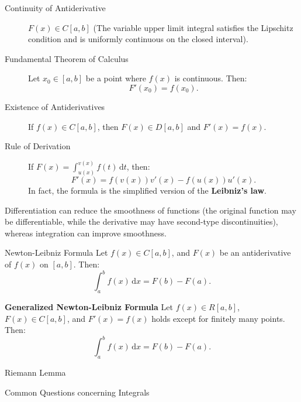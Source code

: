 \documentclass[11pt]{../../TexTemplate/elegantbook}
\begin{document}
\begin{property}
    \begin{description}
        \item [Continuity of Antiderivative]  \( F(x) \in C[a, b] \) (The variable upper limit integral satisfies the 
            Lipschitz condition and is uniformly continuous on the closed interval).
        \item [Fundamental Theorem of Calculus] Let \( x_0 \in [a, b] \) be a point where \( f(x) \) is continuous. Then:
            \[
            F'(x_0) = f(x_0).
            \]
        \item [Existence of Antiderivatives] If \( f(x) \in C[a, b] \), then \( F(x) \in D[a, b] \) and \( F'(x) = f(x) \).
        \item [Rule of Derivation] If \( F(x) = \int_{u(x)}^{v(x)} f(t) \, \mathrm{d}t \), then:
            \[
            F'(x) = f(v(x))v'(x) - f(u(x))u'(x).
            \]
            In fact, the formula is the simplified version of the \textbf{Leibniz's law}.
    \end{description}
\end{property}


\begin{remark}
        Differentiation can reduce the smoothness of functions (the original function may be differentiable, 
        while the derivative may have second-type discontinuities), whereas integration can improve smoothness.
\end{remark}

\begin{theorem}{Newton-Leibniz Formula}
    Let \( f(x) \in C[a, b] \), and \( F(x) \) be an antiderivative of \( f(x) \) on \( [a, b] \). Then:
    \[
    \int_{a}^{b} f(x) \, \mathrm{d}x = F(b) - F(a).
    \]

    \textbf{Generalized Newton-Leibniz Formula}
    Let \( f(x) \in R[a, b] \), \( F(x) \in C[a, b] \), and \( F'(x) = f(x) \) holds except for finitely many points. 
    Then:
    \[
    \int_{a}^{b} f(x) \, \mathrm{d}x = F(b) - F(a).
    \]
\end{theorem}



\begin{leftbarTitle}{Riemann Lemma}\end{leftbarTitle}

\begin{leftbarTitle}{Common Questions concerning Integrals}\end{leftbarTitle}
\end{document}
